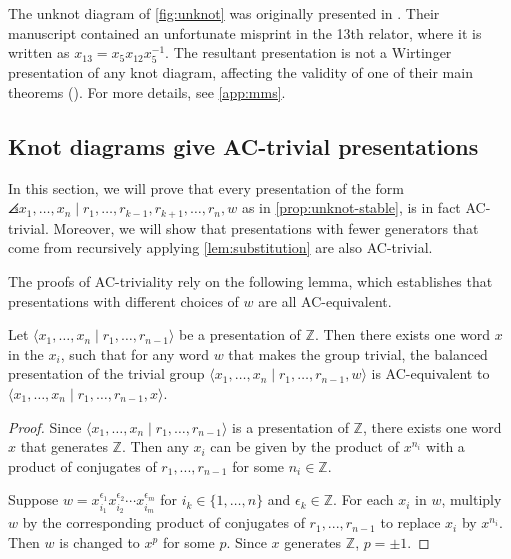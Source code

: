 \begin{remark}
The unknot diagram of \cref{fig:unknot} was originally presented in \cite{MMS}. Their manuscript contained an unfortunate misprint in the 13th relator, where it is written as $x_{13}=x_5 x_{12} x_5^{-1}$.  The resultant presentation is not a Wirtinger presentation of any knot diagram, affecting the validity of one of their main theorems (\cite[Theorem 1.4]{MMS}). For more details, see \cref{app:mms}.
\end{remark}


\subsection{Knot diagrams give AC-trivial presentations} \label{sec:proofs}
In this section, we will prove that every presentation of the form  
 $\angles{ x_1,\ldots, x_n \mid r_1,\ldots, r_{k-1}, r_{k+1},\ldots, r_n, w}$ as in \cref{prop:unknot-stable}, is in fact AC-trivial. Moreover, we will show that presentations with fewer generators that come from recursively applying \cref{lem:substitution} are also AC-trivial. 

The proofs of AC-triviality rely on the following lemma, which establishes that presentations with different choices of $w$ are all AC-equivalent. 

\begin{lemma}
\label{lem:all_ac_equiv}
    Let $\langle x_1,\ldots, x_n \mid r_1,\ldots,r_{n-1}\rangle$ be a presentation of $\mathbb{Z}$. Then there exists one word $x$ in the $x_i$, such that for any word $w$ that makes the group trivial, the balanced presentation of the trivial group $\langle x_1,\ldots, x_n \mid r_1,\ldots,r_{n-1}, w\rangle$ is AC-equivalent to $\langle x_1,\ldots, x_n \mid r_1,\ldots,r_{n-1}, x\rangle$.
\end{lemma}

\begin{proof}[Proof]
    Since $\langle x_1,\ldots, x_n \mid r_1,\ldots,r_{n-1}\rangle$ is a presentation of $\mathbb{Z}$, there exists one word $x$ that generates $\mathbb{Z}$. Then any $x_i$ can be given by the product of $x^{n_i}$ with a product of conjugates of $r_1,...,r_{n-1}$ for some $n_i\in\mathbb{Z}$.

Suppose $w=x_{i_1}^{\epsilon_ 1}x_{i_2}^{\epsilon_2}\cdots x_{i_m}^{\epsilon_m}$ for $i_k\in \{1,\ldots,n\}$ and $\epsilon_k\in\mathbb{Z}$. For each $x_i$ in $w$, multiply $w$ by the corresponding product of conjugates of $r_1,...,r_{n-1}$ to replace $x_i$ by $x^{n_i}$. Then $w$ is changed to $x^p$ for some $p$. Since $x$ generates $\mathbb{Z}$, $p=\pm 1$. 
\end{proof}


